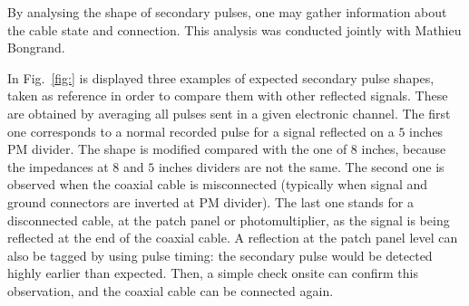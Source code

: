 By analysing the shape of secondary pulses, one may gather information about the cable state and connection.
This analysis was conducted jointly with Mathieu Bongrand.

In Fig.~\ref{fig:} is displayed three examples of expected secondary pulse shapes, taken as reference in order to compare them with other reflected signals.
These are obtained by averaging all pulses sent in a given electronic channel.
The first one corresponds to a normal recorded pulse for a signal reflected on a $5$ inches PM divider.
The shape is modified compared with the one of $8$ inches, because the impedances at $8$ and $5$ inches dividers are not the same.
The second one is observed when the coaxial cable is misconnected (typically when signal and ground connectors are inverted at PM divider).
The last one stands for a disconnected cable, at the patch panel or photomultiplier, as the signal is being reflected at the end of the coaxial cable.
A reflection at the patch panel level can also be tagged by using pulse timing: the secondary pulse would be detected highly earlier than expected.
Then, a simple check onsite can confirm this observation, and the coaxial cable can be connected again.
